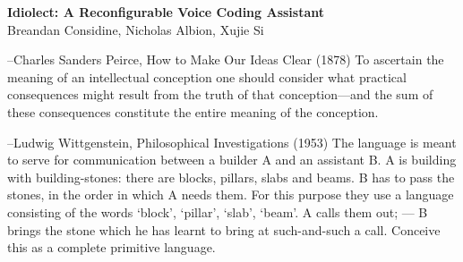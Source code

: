 \documentclass[portrait,a0b,final,a4resizeable]{a0poster}
\begin{document}
\begin{poster}
    \vspace{1\baselineskip}   %


    \begin{center}
        \begin{pcolumn}{1.03}
            \begin{minipage}[c][9cm][c]{0.85\textwidth}
                \begin{center}
                {\veryHuge \textbf{Idiolect: A Reconfigurable Voice Coding Assistant}}\\[10mm]
                {\huge Breandan Considine, Nicholas Albion, Xujie Si\\[7.5mm]
                }
                \end{center}
            \end{minipage}
        \end{pcolumn}
    \end{center}

    \vspace*{1.5cm}

    \large



    \Large

    \begin{multicols}{2}


        \begin{aquote}{--Charles Sanders Peirce, How to Make Our Ideas Clear (1878)}
            To ascertain the meaning of an intellectual conception one should consider what practical consequences might result from the truth of that conception—and the sum of these consequences constitute the entire meaning of the conception.
        \end{aquote}

        \vspace{20pt}

        \begin{aquote}{--Ludwig Wittgenstein, Philosophical Investigations
        (1953)}
            The language is meant to serve for communication between a builder A and an assistant B. A is building with building-stones: there are blocks, pillars, slabs and beams. B has to pass the stones, in the order in which A needs them. For this purpose they use a language consisting of the words `block', `pillar', `slab', `beam'. A calls them out; — B brings the stone which he has learnt to bring at such-and-such a call. Conceive this as a complete primitive language.
        \end{aquote}
        \vspace{10pt}


\end{multicols}
\end{poster}
\end{document}

